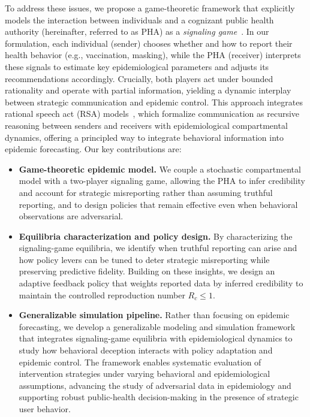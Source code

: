 \documentclass[sigconf,review]{acmart}
\begin{document}
To address these issues, we propose a game-theoretic framework that explicitly models the interaction between individuals and a cognizant public health authority (hereinafter, referred to as PHA) as a \emph{signaling game}~\cite{SobelGT2020}. In our formulation, each individual (sender) chooses whether and how to report their health behavior (e.g., vaccination, masking), while the PHA (receiver) interprets these signals to estimate key epidemiological parameters and adjusts its recommendations accordingly. Crucially, both players act under bounded rationality and operate with partial information, yielding a dynamic interplay between strategic communication and epidemic control. This approach integrates rational speech act (RSA) models~\cite{DegenARL2023}, which formalize communication as recursive reasoning between senders and receivers with epidemiological compartmental dynamics, offering a principled way to integrate behavioral information into epidemic forecasting.  Our key contributions are:
\begin{itemize}
    \item \textbf{Game-theoretic epidemic model.} We couple a stochastic compartmental model with a two-player signaling game, allowing the PHA to infer credibility and account for strategic misreporting rather than assuming truthful reporting, and to design policies that remain effective even when behavioral observations are adversarial.
    
    \item \textbf{Equilibria characterization and policy design.} 
    By characterizing the signaling-game equilibria, we identify when truthful reporting can arise and how policy levers can be tuned to deter strategic misreporting while preserving predictive fidelity. Building on these insights, we design an adaptive feedback policy that weights reported data by inferred credibility to maintain the controlled reproduction number $R_c \leq 1$.
    

    \item \textbf{Generalizable simulation pipeline.} Rather than focusing on epidemic forecasting, we develop a generalizable modeling and simulation framework that integrates signaling-game equilibria with epidemiological dynamics to study how behavioral deception interacts with policy adaptation and epidemic control. The framework enables systematic evaluation of intervention strategies under varying behavioral and epidemiological assumptions, advancing the study of adversarial data in epidemiology and supporting robust public-health decision-making in the presence of strategic user behavior.

\end{itemize}
\end{document}
